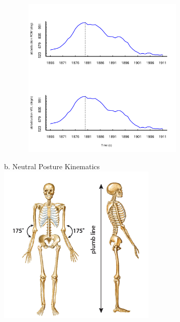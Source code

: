 \documentclass{article}\usepackage[]{graphicx}\usepackage[]{color}
\newenvironment{knitrout}{}{} %
\begin{document}
\begin{knitrout}
\color{fgcolor}

\includegraphics[width=4in,height=3in]{figure/latex-unnamed-chunk-3-1} \hfill{}



\end{knitrout}

\newpage

b. Neutral Posture Kinematics\\
\includegraphics{SkeletonArmPosition.png}\\

\newpage
\end{document}
